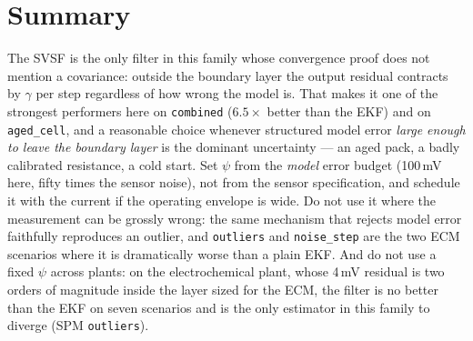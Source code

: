 \section{Summary}
The SVSF is the only filter in this family whose convergence proof does not mention a covariance:
outside the boundary layer the output residual contracts by $\gamma$ per step regardless of how
wrong the model is.  That makes it one of the strongest performers here on \texttt{combined}
($6.5\times$ better than the EKF) and on \texttt{aged\_cell}, and a reasonable choice whenever
structured model error \emph{large enough to leave the boundary layer} is the dominant uncertainty
--- an aged pack, a badly calibrated resistance, a cold start.  Set $\psi$ from the \emph{model}
error budget (100\,mV here, fifty times the sensor noise), not from the sensor specification, and
schedule it with the current if the operating envelope is wide.  Do not use it where the
measurement can be grossly wrong: the same mechanism that rejects model error faithfully reproduces
an outlier, and \texttt{outliers} and \texttt{noise\_step} are the two ECM scenarios where it is
dramatically worse than a plain EKF.  And do not use a fixed $\psi$ across plants: on the
electrochemical plant, whose 4\,mV residual is two orders of magnitude inside the layer sized for
the ECM, the filter is no better than the EKF on seven scenarios and is the only estimator in this
family to diverge (SPM \texttt{outliers}).
